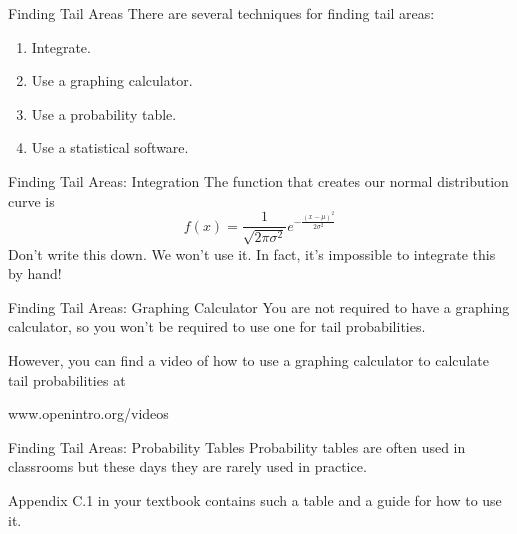 \begin{frame}{Finding Tail Areas}
    There are several techniques for finding tail areas:
    \begin{enumerate}
        \item Integrate.
        \item Use a graphing calculator.
        \item Use a probability table.
        \item Use a statistical software.
    \end{enumerate}
\end{frame}

\begin{frame}{Finding Tail Areas: Integration}
    The function that creates our normal distribution curve is
    \[
        f(x) = \frac{1}{\sqrt{2\pi\sigma^2}}e^{-\frac{(x-\mu)^2}{2\sigma^2}}
    \]
    Don't write this down. We won't use it. In fact, it's impossible to integrate this by hand!
\end{frame}

\begin{frame}{Finding Tail Areas: Graphing Calculator}
    You are not required to have a graphing calculator, so you won't be required to use one for tail probabilities.
    
    \vspace{12pt}However, you can find a video of how to use a graphing calculator to calculate tail probabilities at 
    \begin{center}
        www.openintro.org/videos
    \end{center}
\end{frame}

\begin{frame}{Finding Tail Areas: Probability Tables}
    Probability tables are often used in classrooms but these days they are rarely used in practice. 
    
    \vspace{12pt}Appendix C.1 in your textbook contains such a table and a guide for how to use it.
\end{frame}

